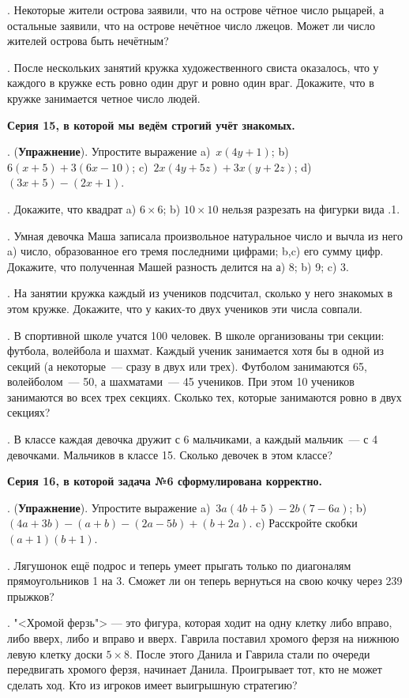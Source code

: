 . Некоторые жители острова заявили, что на острове чётное число рыцарей, 
а остальные заявили, что на острове нечётное число лжецов. Может ли число жителей острова быть нечётным?  

. После нескольких занятий кружка художественного свиста оказалось, что
у каждого в кружке есть ровно один друг и ровно один враг. Докажите, что
в кружке занимается четное число людей.


\centerline{\bf Серия 15, в которой мы ведём строгий учёт знакомых.}
 
. ({\bf Упражнение}). Упростите выражение
a)~$x(4y+1)$; b)~$6(x+5)+3(6x-10)$; c)~$2x(4y+5z)+3x(y+2z)$;
d)~$(3x+5)-(2x+1)$. 

. Докажите, что квадрат a) $6\times 6$; b) $10\times 10$ нельзя разрезать на
фигурки вида \lower.1\cellsize\cells{
 _ _ _ _
|_|_|_|_|
}.

. Умная девочка Маша записала произвольное
натуральное число и вычла из него a) число, образованное его
тремя последними цифрами; b,c) его сумму цифр.
Докажите, что полученная Машей разность делится на а) 8; b) 9; c) 3.

. На занятии кружка каждый из учеников подсчитал,
сколько у него знакомых в этом кружке. Докажите, что у каких-то двух
учеников эти числа совпали.  

. В спортивной школе учатся 100 человек. В школе организованы три секции:
футбола, волейбола и шахмат. Каждый ученик занимается хотя бы в одной из секций
(а некоторые~--- сразу в двух или трех). Футболом занимаются 65,
волейболом~--- 50, а шахматами~--- 45 учеников. При этом 10 учеников
занимаются во всех трех секциях. Сколько тех, которые занимаются ровно в двух секциях?

. В классе каждая девочка дружит с 6 мальчиками,
а каждый мальчик~--- с 4 девочками. Мальчиков
в классе 15. Сколько девочек в этом классе?


\centerline{\bf Серия 16, в которой задача №6 сформулирована корректно.}

. ({\bf Упражнение}). Упростите выражение
a)~$3a(4b+5)-2b(7-6a)$;
b)~$(4a+3b)-(a+b)-(2a-5b)+(b+2a)$.  
c) Расскройте скобки $(a+1)(b+1)$.

. Лягушонок ещё подрос и теперь умеет прыгать только по диагоналям
прямоугольников 1 на 3. Сможет ли он теперь вернуться на свою кочку через 239 прыжков?

. "<Хромой ферзь"> ---  это фигура, которая ходит на одну клетку либо  
вправо, либо  вверх, либо и вправо и вверх.
Гаврила поставил хромого ферзя на нижнюю левую клетку доски $5\times 8$. 
После этого Данила и Гаврила стали по очереди передвигать хромого ферзя, начинает Данила.  
Проигрывает тот, кто не может сделать ход. Кто из игроков 
имеет выигрышную стратегию?

